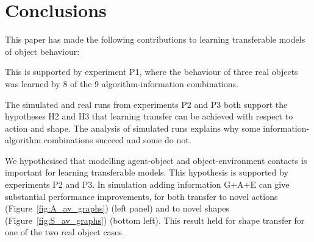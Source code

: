 
\section{Conclusions}\label{sec:Discussion}

This paper has made the following contributions to learning transferable models of object behaviour:

 This is supported by experiment P1, where the behaviour of three real objects was learned by 8 of the 9 algorithm-information combinations. 

 The simulated and real runs from experiments P2 and P3 both support the hypotheses H2  and H3 that learning transfer can be achieved with respect to action and shape. The analysis of simulated runs explains why some information-algorithm combinations succeed and some do not. 

 We hypothesised that modelling agent-object and object-environment contacts is important for learning transferable models. This hypothesis is supported by experiments P2 and P3. In simulation adding information G+A+E can give substantial performance improvements, for both transfer to novel actions (Figure~\ref{fig:A_av_graphs}) (left panel) and to novel shapes (Figure~\ref{fig:S_av_graphs}) (bottom left).  This result held for shape transfer for one of the two real object cases. 



